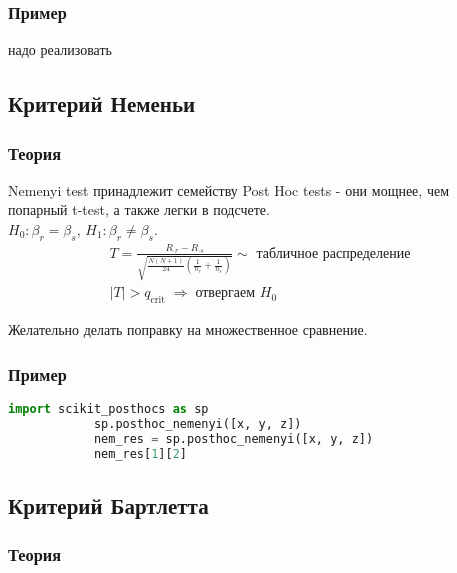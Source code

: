 		\subsubsection*{Пример}\label{cha:uniform/sec:k/subsec:john/subsubsec:prob}

		надо реализовать

	\subsection{Критерий Неменьи}\label{cha:uniform/sec:k/nemeni}

		\subsubsection*{Теория}\label{cha:uniform/sec:k/subsec:nemeni/subsubsec:theory}

		Nemenyi test принадлежит семейству Post Hoc tests - они мощнее, чем попарный t-test, а также легки в подсчете.\\

		$H_0: \beta_r = \beta_s$, $H_1: \beta_r \not = \beta_s$.
		$$\begin{gathered}
			T = \frac{R_{\cdot r} - R_{\cdot s}}{\sqrt{\frac{N(N+1)}{24}\left( \frac{1}{n_r} + \frac{1}{n_s} \right)}} \sim \text{ табличное распределение} \\
			|T| > q_{\text{crit}} \; \Rightarrow \; \text{отвергаем } H_0
		\end{gathered}$$

		Желательно делать поправку на множественное сравнение.

		\subsubsection*{Пример}\label{cha:uniform/sec:k/subsec:nemeni/subsubsec:prob}

		\begin{lstlisting}[language=Python]
			import scikit_posthocs as sp
			sp.posthoc_nemenyi([x, y, z])
			nem_res = sp.posthoc_nemenyi([x, y, z])
			nem_res[1][2]
		\end{lstlisting}

	\subsection{Критерий Бартлетта}\label{cha:uniform/sec:k/bartlet}

		\subsubsection*{Теория}\label{cha:uniform/sec:k/subsec:bartlet/subsubsec:theory}

